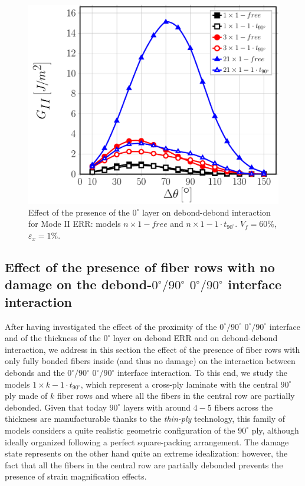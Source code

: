 \documentclass[review]{elsarticle}
\begin{document}
\begin{figure}[!h]
\centering
\includegraphics[width=\textwidth]{nx1-1-vf60-GII.pdf}
\caption{Effect of the presence of the $0^{\circ}$ layer on debond-debond interaction for Mode II ERR: models $n\times 1-free$ and $n\times 1-1\cdot t_{90^{\circ}}$. $V_{f}=60\%$, $\varepsilon_{x}=1\%$.}\label{fig:debonddebondGII}
\end{figure}

\subsection{Effect of the presence of fiber rows with no damage on the debond-$0^{\circ}/90^{\circ}$ $0^{\circ}/90^{\circ}$ interface interaction}

After having investigated the effect of the proximity of the $0^{\circ}/90^{\circ}$ $0^{\circ}/90^{\circ}$ interface and of the thickness of the $0^{\circ}$ layer on debond ERR and on debond-debond interaction, we address in this section the effect of the presence of fiber rows with only fully bonded fibers inside (and thus no damage) on the interaction between debonds and the $0^{\circ}/90^{\circ}$ $0^{\circ}/90^{\circ}$ interface interaction. To this end, we study the models $1\times k-1\cdot t_{90^{\circ}}$, which represent a cross-ply laminate with the central $90^{\circ}$ ply made of $k$ fiber rows and where all the fibers in the central row are partially debonded. Given that today $90^{\circ}$ layers with around $4-5$ fibers across the thickness are manufacturable thanks to the \emph{thin-ply} technology, this family of models considers a quite realistic geometric configuration of the $90^{\circ}$ ply, although ideally organized following a perfect square-packing arrangement. The damage state represents on the other hand quite an extreme idealization: however, the fact that all the fibers in the central row are partially debonded prevents the presence of strain magnification effects.
\end{document}
